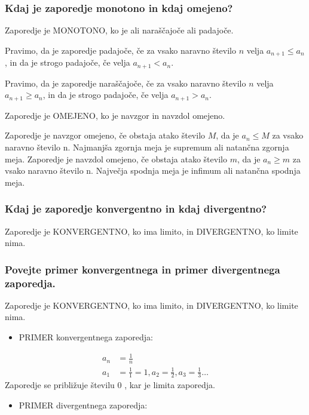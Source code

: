 \documentclass{article}
\begin{document}
\subsubsection*{Kdaj je zaporedje monotono in kdaj omejeno?}

Zaporedje je MONOTONO, ko je ali naraščajoče ali padajoče.

Pravimo, da je zaporedje padajoče, če za vsako naravno število $n$ velja $a_{n+1} \leq a_{n}$, in da je strogo padajoče, če velja $a_{n+1}<a_{n}$.

Pravimo, da je zaporedje naraščajoče, če za vsako naravno število $n$ velja $a_{n+1} \geq a_{n}$, in da je strogo padajoče, če velja $a_{n+1}>a_{n}$.

Zaporedje je OMEJENO, ko je navzgor in navzdol omejeno.

Zaporedje je navzgor omejeno, če obstaja atako število $M$, da je $a_{n} \leq M$ za vsako naravno število n. Najmanjša zgornja meja je supremum ali natančna zgornja meja. Zaporedje je navzdol omejeno, če obstaja atako število $m$, da je $a_{n} \geq m$ za vsako naravno število n. Največja spodnja meja je infimum ali natančna spodnja meja.

\subsubsection*{Kdaj je zaporedje konvergentno in kdaj divergentno?}

Zaporedje je KONVERGENTNO, ko ima limito, in DIVERGENTNO, ko limite nima.

\subsubsection*{Povejte primer konvergentnega in primer divergentnega zaporedja.}
Zaporedje je KONVERGENTNO, ko ima limito, in DIVERGENTNO, ko limite nima.
\begin{itemize}
  \item PRIMER konvergentnega zaporedja:

\end{itemize}

\begin{align*}
    a_{n}&=\frac{1}{n} \\
    a_{1}&=\frac{1}{1}=1, a_{2}=\frac{1}{2}, a_{3}=\frac{1}{3} \ldots
\end{align*}
Zaporedje se približuje številu 0 , kar je limita zaporedja.

\begin{itemize}
  \item PRIMER divergentnega zaporedja:
\end{itemize}
\end{document}
